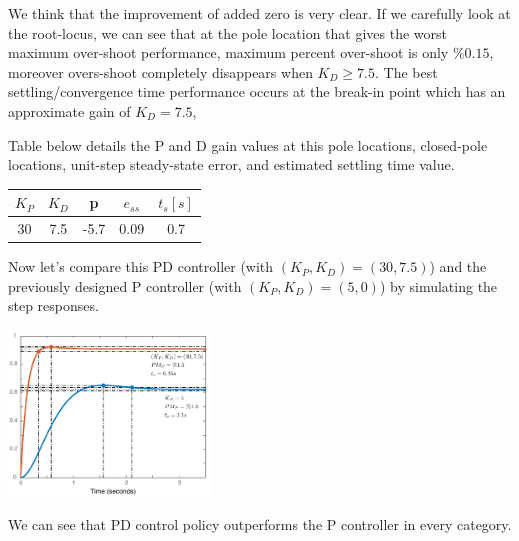 \documentclass[twoside]{article}
\begin{document}
We think that the improvement of added zero is very clear.
If we carefully look at the root-locus, we can see that
at the pole location that gives the worst maximum over-shoot
performance, maximum percent over-shoot is only $\% 0.15$,
moreover overs-shoot completely disappears when $K_D \geq 7.5$.
The best settling/convergence time performance occurs at the
break-in point which has an approximate gain of $K_D = 7.5$,

Table below details the P and D gain values at this pole locations, 
closed-pole locations,  unit-step steady-state error, and estimated
settling time value. 

\vspace{6pt}
\begin{minipage}[h]{1\linewidth}
\begin{center}
\begin{tabular}{|c | c | c | c | c  |}
\hline
$K_P$ &$K_D$ & p & $e_{ss}$ & $t_s [s]$ 
\\ \hline
30 & 7.5& -5.7 & 0.09 & 0.7
\\ \hline
\end{tabular}
\end{center}
\end{minipage}
\vspace{6pt}

Now let's compare this PD controller (with $(K_P,K_D) = (30,7.5)$)
and the previously designed P controller (with $(K_P,K_D) = (5,0)$)
by simulating the step responses. 

\vspace{12 pt}

  \begin{minipage}[h]{1\linewidth}
    \begin{center}
      \includegraphics[width=0.4\textwidth]{PDvsP}
    \end{center}
  \end{minipage}

\vspace{12 pt}

We can see that PD control policy outperforms 
the P controller in every category. 
\end{document}
